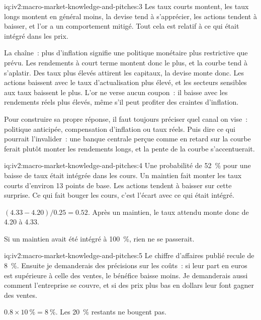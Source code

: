 \begin{solution}{iq:iv2:macro-market-knowledge-and-pitches:3}
Les taux courts montent, les taux longs montent en général moins, la devise tend à s'apprécier, les actions tendent à baisser, et l'or a un comportement mitigé. Tout cela est relatif à ce qui était intégré dans les prix.

La chaîne~: plus d'inflation signifie une politique monétaire plus restrictive que prévu. Les rendements à court terme montent donc le plus, et la courbe tend à s'aplatir. Des taux plus élevés attirent les capitaux, la devise monte donc. Les actions baissent avec le taux d'actualisation plus élevé, et les secteurs sensibles aux taux baissent le plus. L'or ne verse aucun coupon~: il baisse avec les rendements réels plus élevés, même s'il peut profiter des craintes d'inflation.

Pour construire sa propre réponse, il faut toujours préciser quel canal on vise~: politique anticipée, compensation d'inflation ou taux réels. Puis dire ce qui pourrait l'invalider~: une banque centrale perçue comme en retard sur la courbe ferait plutôt monter les rendements longs, et la pente de la courbe s'accentuerait.

\end{solution}

\begin{solution}{iq:iv2:macro-market-knowledge-and-pitches:4}
Une probabilité de 52~\% pour une baisse de taux était intégrée dans les cours. Un maintien fait monter les taux courts d'environ 13 points de base. Les actions tendent à baisser sur cette surprise. Ce qui fait bouger les cours, c'est l'écart avec ce qui était intégré.

$(4.33 - 4.20)/0.25 = 0.52$. Après un maintien, le taux attendu monte donc de 4.20 à 4.33.

Si un maintien avait été intégré à 100~\%, rien ne se passerait.

\end{solution}

\begin{solution}{iq:iv2:macro-market-knowledge-and-pitches:5}
Le chiffre d'affaires publié recule de 8~\%. Ensuite je demanderais des précisions sur les coûts~: si leur part en euros est supérieure à celle des ventes, le bénéfice baisse moins. Je demanderais aussi comment l'entreprise se couvre, et si des prix plus bas en dollars leur font gagner des ventes.

$0.8 \times 10~\% = 8~\%$. Les 20~\% restants ne bougent pas.

\end{solution}

